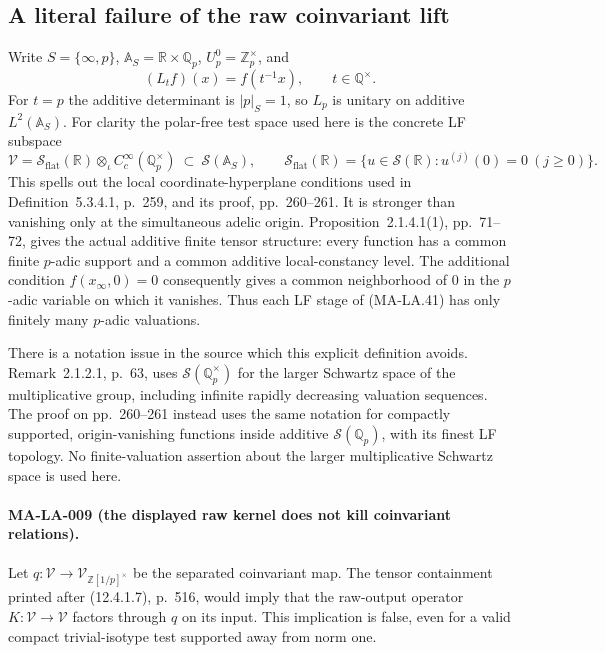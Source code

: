 \subsection{A literal failure of the raw coinvariant lift}

Write $S=\{\infty,p\}$, $\mathbb A_S=\mathbb R\times\mathbb Q_p$,
$U_p^0=\mathbb Z_p^\times$, and
\[
 (L_t f)(x)=f(t^{-1}x),\qquad t\in\mathbb Q^\times.
 \tag{MA-LA.40}
\]
For $t=p$ the additive determinant is $|p|_S=1$, so $L_p$
is unitary on additive $L^2(\mathbb A_S)$.  For clarity the
polar-free test space used here is the concrete LF subspace
\[
 \mathcal V=\mathcal S_{\mathrm{flat}}(\mathbb R)
                 \otimes_\iota C_c^\infty(\mathbb Q_p^\times)
       \ \subset\ \mathcal S(\mathbb A_S),
 \qquad
 \mathcal S_{\mathrm{flat}}(\mathbb R)
       =\{u\in\mathcal S(\mathbb R):u^{(j)}(0)=0\ (j\ge0)\}.
 \tag{MA-LA.41}
\]
This spells out the local coordinate-hyperplane conditions used
in Definition~5.3.4.1, p.~259, and its proof, pp.~260--261.
It is stronger than vanishing only at the simultaneous adelic
origin.  Proposition~2.1.4.1(1), pp.~71--72, gives the actual
additive finite tensor structure: every function has a common
finite $p$-adic support and a common additive local-constancy
level.  The additional condition $f(x_\infty,0)=0$ consequently
gives a common neighborhood of $0$ in the $p$-adic variable on
which it vanishes.  Thus each LF stage of (MA-LA.41) has only
finitely many $p$-adic valuations.

There is a notation issue in the source which this explicit
definition avoids.  Remark~2.1.2.1, p.~63, uses
$\mathcal S(\mathbb Q_p^\times)$ for the larger Schwartz space
of the multiplicative group, including infinite rapidly decreasing
valuation sequences.  The proof on pp.~260--261 instead uses the
same notation for compactly supported, origin-vanishing functions
inside additive $\mathcal S(\mathbb Q_p)$, with its finest LF
topology.  No finite-valuation assertion about the larger
multiplicative Schwartz space is used here.

\paragraph{MA-LA-009 (the displayed raw kernel does not kill coinvariant relations).}
Let $q:\mathcal V\to\mathcal V_{\mathbb Z[1/p]^\times}$ be
the separated coinvariant map.  The tensor containment printed
after (12.4.1.7), p.~516, would imply that the raw-output operator
$K:\mathcal V\to\mathcal V$ factors through $q$ on its input.
This implication is false, even for a valid compact trivial-isotype
test supported away from norm one.

